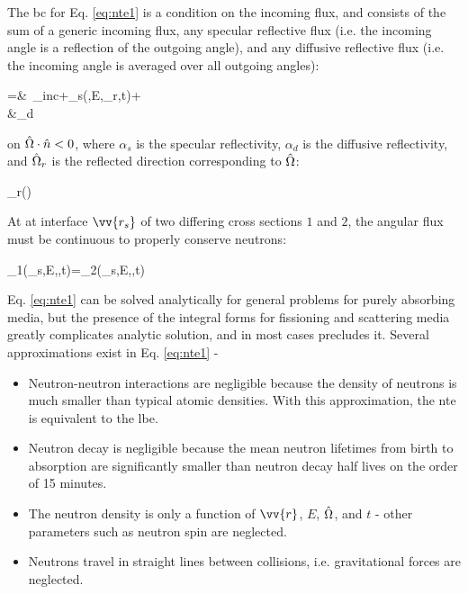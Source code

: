 The \gls{bc} for Eq. \eqref{eq:nte1} is a condition on the incoming flux, and consists of the sum of a generic incoming flux, any specular reflective flux (i.e. the incoming angle is a reflection of the outgoing angle), and any diffusive reflective flux (i.e. the incoming angle is averaged over all outgoing angles):

\beqa
\label{eq:NTEBCs}
\psi\seat=&\ \psi_{inc}\seat+\alpha_s\seat\psi(,E,\hO_r,t)+\\
&\hspace{1cm}\alpha_d\seat{}
\eeqa

on \(\hat{\Omega}\cdot\hat{n}<0\), where \(\alpha_s\) is the specular reflectivity, \(\alpha_d\) is the diffusive reflectivity, and \(\hat{\Omega}_r\) is the reflected direction corresponding to \(\hat{\Omega}\):

\beq
\label{eq:hOrDef}
\hO_r\equiv{}\left(\hO\cdot{}\right)
\eeq

At at interface \(\vv{r_s}\) of two differing cross sections \(1\) and \(2\), the angular flux must be continuous to properly conserve neutrons:

\beq
\label{eq:NTE_interface}
\psi_1(_s,E,\hO,t)=\psi_2(_s,E,\hO,t)
\eeq

Eq. \eqref{eq:nte1} can be solved analytically for general problems for purely absorbing media, but the presence of the integral forms for fissioning and scattering media greatly complicates analytic solution, and in most cases precludes it. Several approximations exist in Eq. \eqref{eq:nte1} -

\begin{itemize}
\item Neutron-neutron interactions are negligible because the density of neutrons is much smaller than typical atomic densities. With this approximation, the \gls{nte} is equivalent to the \gls{lbe}.
\item Neutron decay is negligible because the mean neutron lifetimes from birth to absorption are significantly smaller than neutron decay half lives on the order of 15 minutes.
\item The neutron density is only a function of \(\vv{r}\), \(E\), \(\hat{\Omega}\), and \(t\) - other parameters such as neutron spin are neglected.
\item Neutrons travel in straight lines between collisions, i.e. gravitational forces are neglected.
\end{itemize}

